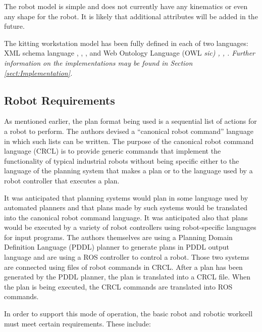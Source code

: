 The robot model is simple and does not currently have any kinematics or
even any shape for the robot. It is likely that additional attributes will
be added in the future.

The kitting workstation model has been fully defined in each of two
languages: XML schema language \cite{Walmsley.2002},
\cite{XMLschemaPrimer}, \cite{XMLschemaStructures}, and Web Ontology
Language (OWL \it sic\rm) \cite{OWLoverview}, \cite{OWLprimer},
\cite{OWLspec}. Further information on the implementations may be
found in Section \ref{sect:Implementation}. 

\subsection{Robot Requirements}
As mentioned earlier, the plan format being used is a sequential list of
actions for a robot to perform. The authors devised a ``canonical robot
command'' language in which such lists can be written. The purpose of the
canonical robot command language (CRCL) is to provide generic commands that
implement the functionality of typical industrial robots without being
specific either to the language of the planning system that makes a plan or
to the language used by a robot controller that executes a plan.

It was anticipated that planning systems would plan in some language used
by automated planners and that plans made by such systems would be
translated into the canonical robot command language. It was anticipated
also that plans would be executed by a variety of robot controllers using
robot-specific languages for input programs. The authors themselves are
using a Planning Domain Definition Language (PDDL)
 planner \cite{PDDL} to generate plans in PDDL output language
and are using a ROS controller \cite{ROS} to control a robot. Those two
systems are connected using files of robot commands in CRCL. After a plan
has been generated by the PDDL planner, the plan is translated into a CRCL
file. When the plan is being executed, the CRCL commands are translated
into ROS commands.

In order to support this mode of operation, the basic robot and robotic
workcell must meet certain requirements. These include:

